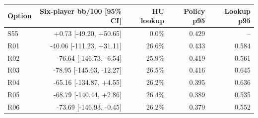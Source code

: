 \begin{tabular}{lrrrr}
\toprule
Option & Six-player bb/100 [95\% CI] & HU lookup & Policy p95 & Lookup p95 \\
\midrule
S55 & +0.73 [-49.20, +50.65] & 0.0\% & 0.429 & -- \\
R01 & -40.06 [-111.23, +31.11] & 26.6\% & 0.433 & 0.584 \\
R02 & -76.64 [-146.73, -6.54] & 25.9\% & 0.419 & 0.561 \\
R03 & -78.95 [-145.63, -12.27] & 26.5\% & 0.416 & 0.645 \\
R04 & -65.16 [-134.87, +4.55] & 26.2\% & 0.395 & 0.636 \\
R05 & -68.79 [-140.44, +2.86] & 26.4\% & 0.389 & 0.535 \\
R06 & -73.69 [-146.93, -0.45] & 26.2\% & 0.379 & 0.552 \\
\bottomrule
\end{tabular}
